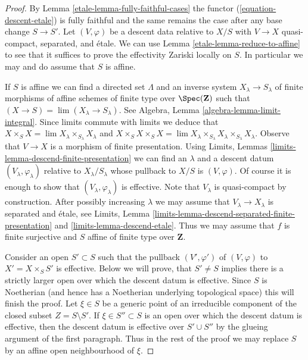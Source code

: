 \begin{proof}

By Lemma \ref{etale-lemma-fully-faithful-cases} the
functor (\ref{equation-descent-etale})
is fully faithful and the same remains the case after any
base change $S \to S'$. Let $(V, \varphi)$ be a descent data
relative to $X/S$ with $V \to X$ quasi-compact, separated, and \'etale.
We can use Lemma \ref{etale-lemma-reduce-to-affine}
to see that it suffices to prove the effectivity
Zariski locally on $S$. In particular we may and do
assume that $S$ is affine.

\medskip\noindent
If $S$ is affine we can find a directed set $\Lambda$ and
an inverse system $X_\lambda \to S_\lambda$
of finite morphisms of affine schemes of finite type over
$\Spec(\mathbf{Z})$ such that $(X \to S) = \lim (X_\lambda \to S_\lambda)$.
See Algebra, Lemma \ref{algebra-lemma-limit-integral}.
Since limits commute with limits we deduce that
$X \times_S X = \lim X_\lambda \times_{S_\lambda} X_\lambda$
and
$X \times_S X \times_S X = \lim
X_\lambda \times_{S_\lambda} X_\lambda \times_{S_\lambda} X_\lambda$.
Observe that $V \to X$ is a morphism of finite presentation.
Using Limits, Lemmas \ref{limits-lemma-descend-finite-presentation}
we can find an $\lambda$ and a descent datum $(V_\lambda, \varphi_\lambda)$
relative to $X_\lambda/S_\lambda$ whose pullback to $X/S$ is
$(V, \varphi)$. Of course it is enough to show that
$(V_\lambda, \varphi_\lambda)$ is effective. Note that $V_\lambda$
is quasi-compact by construction.
After possibly increasing $\lambda$ we may assume
that $V_\lambda \to X_\lambda$ is separated and \'etale, see
Limits, Lemma \ref{limits-lemma-descend-separated-finite-presentation} and
\ref{limits-lemma-descend-etale}.
Thus we may assume that $f$ is finite surjective and
$S$ affine of finite type over $\mathbf{Z}$.

\medskip\noindent
Consider an open $S' \subset S$ such that the pullback $(V', \varphi')$
of $(V, \varphi)$ to $X' = X \times_S S'$ is effective. Below we will
prove, that $S' \not = S$ implies there is a strictly larger open over
which the descent datum is effective. Since $S$ is Noetherian (and hence
has a Noetherian underlying topological space) this will finish the proof.
Let $\xi \in S$ be a generic point of an irreducible component of the
closed subset $Z = S \setminus S'$.
If $\xi \in S'' \subset S$ is an open over which the descent datum is
effective, then the descent datum is effective over
$S' \cup S''$ by the glueing argument of the first paragraph. Thus
in the rest of the proof we may replace $S$ by an affine open
neighbourhood of $\xi$.


\end{proof}
